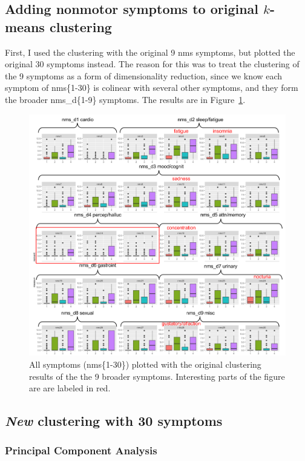 \documentclass[10pt]{article}
\begin{document}
\begin{multicols}{2}
\subsection{Adding nonmotor symptoms to original $k$-means clustering}

First, I used the clustering with the original 9 nms symptoms, but plotted the original 30 symptoms
instead. The reason for this was to treat the clustering of the 9 symptoms as a form of
dimensionality reduction, since we know each symptom of nms\{1-30\} is colinear with several other
symptoms, and they form the broader nms\_d\{1-9\} symptoms. The results are in
Figure~\ref{fig:d9to30}.

\begin{figure}[p]
  \centering
  \includegraphics[width=\linewidth]{d9to30.png}
  \caption{All symptoms (nms\{1-30\}) plotted with the original clustering results of the the 9
broader symptoms. Interesting parts of the figure are are labeled in red.}
  \label{fig:d9to30}
\end{figure}

\subsection{\emph{New} clustering with 30 symptoms}

\subsubsection{Principal Component Analysis}


\end{multicols}
\end{document}
